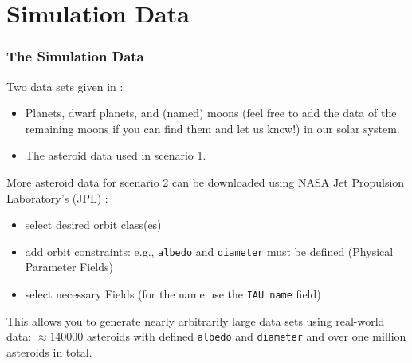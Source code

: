 \section{Simulation Data}
\begin{frame}
    \frametitle{The Simulation Data}
    Two data sets given in :
    \begin{itemize}
        \item Planets, dwarf planets, and (named) moons (feel free to add the data of the remaining moons if you can find them and let us know!) in our solar system. \\[.25em]
        \item The asteroid data used in scenario 1.
    \end{itemize}
    \pause
    \vfill
    More asteroid data for scenario 2 can be downloaded using NASA Jet Propulsion Laboratory's (JPL) :%
    \begin{itemize}
        \item select desired orbit class(es)
        \item add orbit constraints: e.g., \texttt{albedo} and \texttt{diameter} must be defined (Physical Parameter Fields)
        \item select necessary Fields (for the name use the \texttt{IAU name} field)
    \end{itemize}
    This allows you to generate nearly arbitrarily large data sets using real-world data: $\approx\num{140000}$ asteroids with defined \texttt{albedo} and \texttt{diameter} and over one million asteroids in total.
\end{frame}

